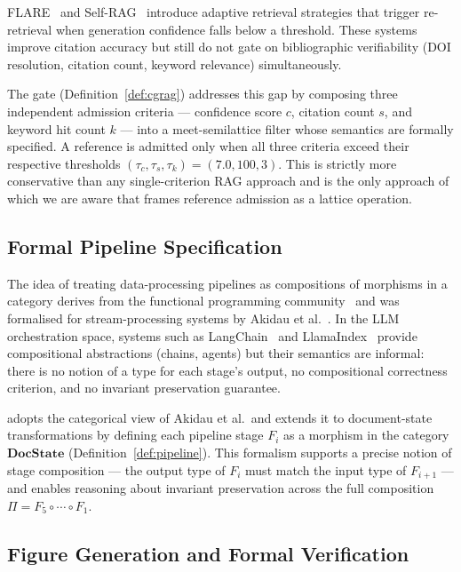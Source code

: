 FLARE~\cite{jiang2023active} and Self-RAG~\cite{asai2024self} introduce adaptive
retrieval strategies that trigger re-retrieval when generation confidence falls below a
threshold.
These systems improve citation accuracy but still do not gate on bibliographic verifiability
(DOI resolution, citation count, keyword relevance) simultaneously.

The \cgrag{} gate (Definition~\ref{def:cgrag}) addresses this gap by composing three
independent admission criteria — confidence score $c$, citation count $s$, and keyword
hit count $k$ — into a meet-semilattice filter whose semantics are formally specified.
A reference is admitted only when all three criteria exceed their respective thresholds
$(\tau_c,\tau_s,\tau_k)=(7.0,100,3)$.
This is strictly more conservative than any single-criterion RAG approach and is the only
approach of which we are aware that frames reference admission as a lattice operation.

\subsection{Formal Pipeline Specification}

The idea of treating data-processing pipelines as compositions of morphisms in a category
derives from the functional programming community~\cite{hughes1989functional} and was
formalised for stream-processing systems by Akidau et al.~\cite{akidau2015dataflow}.
In the LLM orchestration space, systems such as LangChain~\cite{chase2022langchain} and
LlamaIndex~\cite{liu2022llamaindex} provide compositional abstractions (chains, agents)
but their semantics are informal: there is no notion of a type for each stage's output,
no compositional correctness criterion, and no invariant preservation guarantee.

\sys{} adopts the categorical view of Akidau et al.\ and extends it to document-state
transformations by defining each pipeline stage $F_i$ as a morphism in the category
$\mathbf{DocState}$ (Definition~\ref{def:pipeline}).
This formalism supports a precise notion of stage composition — the output type of $F_i$
must match the input type of $F_{i+1}$ — and enables reasoning about invariant preservation
across the full composition $\Pi=F_5\circ\cdots\circ F_1$.

\subsection{Figure Generation and Formal Verification}


